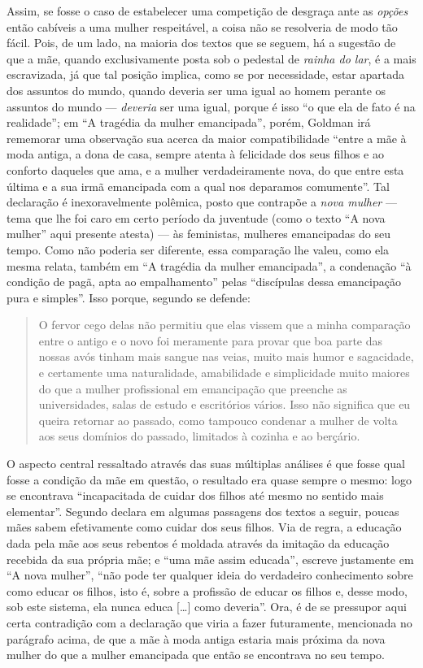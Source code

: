 Assim, se fosse o caso de
estabelecer uma competição de desgraça ante as \textit{opções} então cabíveis
a uma mulher respeitável, a coisa não se resolveria de modo tão fácil.
Pois, de um lado, na maioria dos textos que se seguem, há a sugestão de
que a mãe, quando exclusivamente posta sob o pedestal de \textit{rainha do
lar}, é a mais escravizada, já que tal posição implica, como se por
necessidade, estar apartada dos assuntos do mundo, quando deveria ser
uma igual ao homem perante os assuntos do mundo --- \textit{deveria} ser
uma igual, porque é isso ``o que ela de fato é na realidade''; em ``A
tragédia da mulher emancipada'', porém, Goldman irá rememorar uma
observação sua acerca da maior compatibilidade ``entre a mãe à moda
antiga, a dona de casa, sempre atenta à felicidade dos seus filhos e ao
conforto daqueles que ama, e a mulher verdadeiramente nova, do que entre
esta última e a sua irmã emancipada com a qual nos deparamos
comumente''. Tal declaração é inexoravelmente polêmica, posto que
contrapõe a \textit{nova mulher} --- tema que lhe foi caro em certo período da
juventude (como o texto ``A nova mulher'' aqui presente atesta) --- às
feministas, mulheres emancipadas do seu tempo. Como não poderia ser
diferente, essa comparação lhe valeu, como ela mesma relata, também em
``A tragédia da mulher emancipada'', a condenação ``à condição de pagã,
apta ao empalhamento'' pelas ``discípulas dessa emancipação pura e
simples''. Isso porque, segundo se defende:

\begin{quote}
O fervor cego delas não permitiu que elas vissem que a minha comparação
entre o antigo e o novo foi meramente para provar que boa parte das
nossas avós tinham mais sangue nas veias, muito mais humor e sagacidade,
e certamente uma naturalidade, amabilidade e simplicidade muito maiores
do que a mulher profissional em emancipação que preenche as
universidades, salas de estudo e escritórios vários. Isso não significa
que eu queira retornar ao passado, como tampouco condenar a mulher de
volta aos seus domínios do passado, limitados à cozinha e ao berçário.
\end{quote}

O aspecto central ressaltado através das suas múltiplas análises é que
fosse qual fosse a condição da mãe em questão, o resultado era quase
sempre o mesmo: logo se encontrava ``incapacitada de cuidar dos filhos
até mesmo no sentido mais elementar''. Segundo declara em algumas
passagens dos textos a seguir, poucas mães sabem efetivamente como
cuidar dos seus filhos. Via de regra, a educação dada pela mãe aos seus
rebentos é moldada através da imitação da educação recebida da sua
própria mãe; e ``uma mãe assim educada'', escreve justamente em ``A nova
mulher'', ``não pode ter qualquer ideia do verdadeiro conhecimento sobre
como educar os filhos, isto é, sobre a profissão de educar os filhos e,
desse modo, sob este sistema, ela nunca educa {[}\ldots{]} como deveria''.
Ora, é de se pressupor aqui certa contradição com a declaração que viria
a fazer futuramente, mencionada no parágrafo acima, de que a mãe à moda
antiga estaria mais próxima da nova mulher do que a mulher emancipada
que então se encontrava no seu tempo. 

